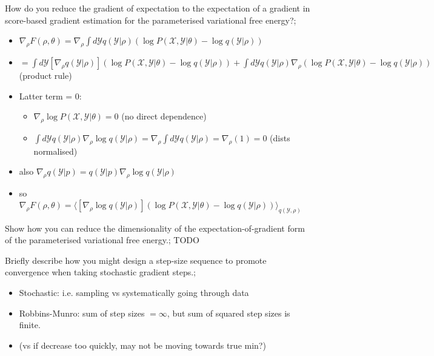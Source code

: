 \documentclass{article}
\begin{document}
How do you reduce the gradient of expectation to the expectation of a gradient in score-based gradient estimation for the parameterised variational free energy?; \begin{itemize}
    \item $\nabla_\rho F(\rho, \theta) = \nabla_\rho \int d\mathcal{Y}q(\mathcal{Y}|\rho)(\log P(\mathcal{X, Y}|\theta) - \log q(\mathcal{Y}|\rho))$
    \item $= \int d\mathcal{Y}[\nabla_{\rho}q(\mathcal{Y}|\rho)](\log P(\mathcal{X, Y}|\theta) - \log q(\mathcal{Y}|\rho)) + \int d\mathcal{Y} q(\mathcal{Y}|\rho)\nabla_\rho(\log P(\mathcal{X, Y}|\theta) - \log q(\mathcal{Y}|\rho))$ (product rule)
    \item Latter term = 0: \begin{itemize}
        \item $\nabla_\rho\log P(\mathcal{X, Y}|\theta) = 0$ (no direct dependence)
        \item $\int d\mathcal{Y}q(\mathcal{Y}|\rho)\nabla_\rho \log q(\mathcal{Y}|\rho) = \nabla_\rho \int d\mathcal{Y}q(\mathcal{Y}|\rho) = \nabla_\rho (1) = 0$ (dists normalised)
    \end{itemize}
    \item also $\nabla_\rho q(\mathcal{Y}|p) = q(\mathcal{Y}|p)\nabla_\rho \log q(\mathcal{Y}|\rho)$
    \item so $\nabla_\rho F(\rho, \theta) = \langle [\nabla_{\rho}\log q(\mathcal{Y}|\rho)](\log P(\mathcal{X, Y}|\theta) - \log q(\mathcal{Y}|\rho)) \rangle_{q(\mathcal{Y}, \rho)}$
\end{itemize}

Show how you can reduce the dimensionality of the expectation-of-gradient form of the parameterised variational free energy.; TODO

Briefly describe how you might design a step-size sequence to promote convergence when taking stochastic gradient steps.; \begin{itemize}
    \item Stochastic: i.e. sampling vs systematically going through data
    \item Robbins-Munro: sum of step sizes $=\infty$, but sum of squared step sizes is finite.
    \item (vs if decrease too quickly, may not be moving towards true min?)
\end{itemize}
\end{document}
